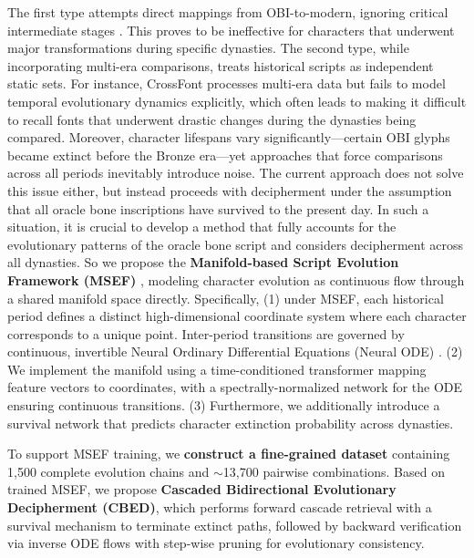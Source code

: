 \documentclass{article}
\begin{document}
The first type attempts direct mappings from OBI-to-modern, ignoring critical intermediate stages \cite{guo2015building, zhang2019oracle, li2023towards}. This proves to be ineffective for characters that underwent major transformations during specific dynasties.
The second type, while incorporating multi-era comparisons, treats historical scripts as independent static sets. For instance, CrossFont \cite{wu2025cross} processes multi-era data but fails to model temporal evolutionary dynamics explicitly, which often leads to making it difficult to recall fonts that underwent drastic changes during the dynasties being compared.
Moreover, character lifespans vary significantly—certain OBI glyphs became extinct before the Bronze era—yet approaches that force comparisons across all periods inevitably introduce noise. The current approach does not solve this issue either, but instead proceeds with decipherment under the assumption that all oracle bone inscriptions have survived to the present day.
In such a situation, it is crucial to develop a method that fully accounts for the evolutionary patterns of the oracle bone script and considers decipherment across all dynasties.
So we propose the \textbf{Manifold-based Script Evolution Framework (MSEF)} \cite{bottero1996origin, meilua2024manifold}, modeling character evolution as continuous flow through a shared manifold space directly.
Specifically, (1) under MSEF, each historical period defines a distinct high-dimensional coordinate system where each character corresponds to a unique point. Inter-period transitions are governed by continuous, invertible Neural Ordinary Differential Equations (Neural ODE) \cite{chen2018neural, rubanova2019latent}. (2) We implement the manifold using a time-conditioned transformer mapping feature vectors to coordinates, with a spectrally-normalized network for the ODE ensuring continuous transitions. (3) Furthermore, we additionally introduce a survival network that predicts character extinction probability across dynasties.

To support MSEF training, we \textbf{construct a fine-grained dataset} containing 1,500 complete evolution chains and $\sim$13,700 pairwise combinations. Based on trained MSEF, we propose \textbf{Cascaded Bidirectional Evolutionary Decipherment (CBED)}, which performs forward cascade retrieval with a survival mechanism to terminate extinct paths, followed by backward verification via inverse ODE flows with step-wise pruning for evolutionary consistency.
\end{document}
